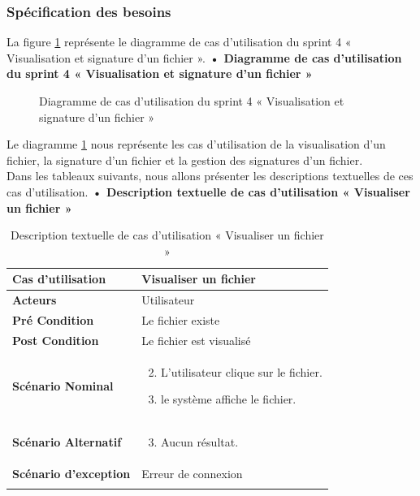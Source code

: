 \subsubsection{Spécification des besoins}
La figure \ref{fig:UseCaseDiagram4} représente le diagramme de cas d'utilisation du sprint 4 « Visualisation et signature d'un fichier ».
\textbf{•	Diagramme de cas d'utilisation du sprint 4 « Visualisation et signature d'un fichier »}
\begin{figure}[H]
  \centering
  \caption{Diagramme de cas d'utilisation du sprint 4 « Visualisation et signature d'un fichier »}
  \label{fig:UseCaseDiagram4}
\end{figure}
Le diagramme \ref{fig:UseCaseDiagram4} nous représente les cas d'utilisation de la visualisation d'un fichier, la signature d'un fichier et la gestion des signatures d'un fichier.\\

Dans les tableaux suivants, nous allons présenter les descriptions textuelles de ces cas d'utilisation.
\textbf{•	Description textuelle de cas d'utilisation « Visualiser un fichier  »}
\begin{longtable}{|p{5cm}|p{10cm}|}
\hline
\textbf{Cas d'utilisation}&Visualiser un fichier\\
\hline
\textbf{Acteurs}&Utilisateur\\
\hline
\textbf{Pré Condition}&Le fichier existe\\
\hline
\textbf{Post Condition}&Le fichier est visualisé\\
\hline
\textbf{Scénario Nominal}&
\vspace{-\baselineskip}
\begin{enumerate}
    \setcounter{enumi}{1}
  \item L'utilisateur clique sur le fichier.
  \item le système affiche le fichier.
\end{enumerate}\\
\hline
\textbf{Scénario Alternatif}&
\vspace{-\baselineskip}
\begin{enumerate}
    \setcounter{enumi}{2}
    \item Aucun résultat.
\end{enumerate}\\
\hline
\textbf{Scénario d'exception}&Erreur de connexion\\
\hline
\caption{Description textuelle de cas d'utilisation « Visualiser un fichier  »}
\label{tab:description-textuelle-de-cas-d-utilisation-visualiser-un-fichier}

\end{longtable}

